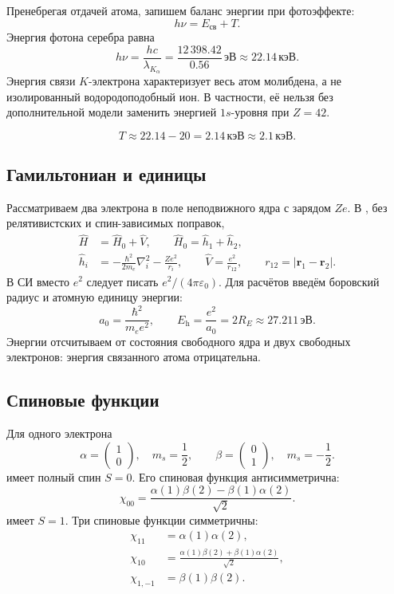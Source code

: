 \documentclass[../final.tex]{subfiles}
\begin{document}
\solution
Пренебрегая отдачей атома, запишем баланс энергии при фотоэффекте:
\[
    h\nu=E_{\text{св}}+T.
\]
Энергия фотона серебра равна
\[
    h\nu=\frac{hc}{\lambda_{K_\alpha}}
       =\frac{12\,398.42}{0.56}\,\text{эВ}
       \approx22.14\,\text{кэВ}.
\]
Энергия связи $K$-электрона характеризует весь атом молибдена,
а не изолированный водородоподобный ион. В частности, её нельзя
без дополнительной модели заменить энергией $1s$-уровня при $Z=42$.

\answer
\[
    T\approx22.14-20=2.14\,\text{кэВ}\approx2.1\,\text{кэВ}.
\]

\endgroup


\subsection*{Гамильтониан и единицы}

Рассматриваем два электрона в поле неподвижного ядра с зарядом $Ze$.
В , без релятивистских и спин-зависимых поправок,
\begin{align*}
    \hat H&=\hat H_0+\hat V,\qquad
    \hat H_0=\hat h_1+\hat h_2,\\
    \hat h_i&=-\frac{\hbar^2}{2m_e}\nabla_i^2-\frac{Ze^2}{r_i},
    \qquad \hat V=\frac{e^2}{r_{12}},
    \qquad r_{12}=|\mathbf r_1-\mathbf r_2|.
\end{align*}
В СИ вместо $e^2$ следует писать $e^2/(4\pi\varepsilon_0)$.
Для расчётов введём боровский радиус и атомную единицу энергии:
\[
    a_0=\frac{\hbar^2}{m_e e^2},\qquad
    E_{\mathrm h}=\frac{e^2}{a_0}=2R_E\approx27.211\,\text{эВ}.
\]
Энергии отсчитываем от состояния свободного ядра и двух свободных
электронов: энергия связанного атома отрицательна.

\subsection*{Спиновые функции}

Для одного электрона
\[
    \alpha=\begin{pmatrix}1\\0\end{pmatrix},\quad m_s=\frac12,
    \qquad
    \beta=\begin{pmatrix}0\\1\end{pmatrix},\quad m_s=-\frac12.
\]
 имеет полный спин $S=0$.
Его спиновая функция антисимметрична:
\[
    \chi_{00}=\frac{\alpha(1)\beta(2)-\beta(1)\alpha(2)}{\sqrt2}.
\]
 имеет $S=1$. Три спиновые функции симметричны:
\begin{align*}
    \chi_{11}&=\alpha(1)\alpha(2),\\
    \chi_{10}&=\frac{\alpha(1)\beta(2)+\beta(1)\alpha(2)}{\sqrt2},\\
    \chi_{1,-1}&=\beta(1)\beta(2).
\end{align*}
\end{document}
